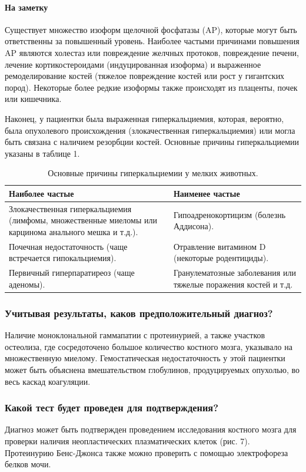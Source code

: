 \documentclass[a4paper,12pt]{book}
\begin{document}
\paragraph{На заметку}
Существует множество изоформ щелочной фосфатазы (AP), которые могут быть ответственны за повышенный уровень. Наиболее частыми причинами повышения AP являются холестаз или повреждение желчных протоков, повреждение печени, лечение кортикостероидами (индуцированная изоформа) и выраженное ремоделирование костей (тяжелое повреждение костей или рост у гигантских пород). Некоторые более редкие изоформы также происходят из плаценты, почек или кишечника.

Наконец, у пациентки была выраженная гиперкальциемия, которая, вероятно, была опухолевого происхождения (злокачественная гиперкальциемия) или могла быть связана с наличием резорбции костей. Основные причины гиперкальциемии указаны в таблице 1.

\begin{table}[htbp]
\centering
\caption{Основные причины гиперкальциемии у мелких животных.}
\begin{tabular}{p{7cm}p{7cm}}
\toprule
Наиболее частые & Наименее частые \\
\midrule
Злокачественная гиперкальциемия (лимфомы, множественные миеломы или карцинома анального мешка и т.д.). & Гипоадренокортицизм (болезнь Аддисона). \\
Почечная недостаточность (чаще встречается гипокальциемия). & Отравление витамином D (некоторые родентициды). \\
Первичный гиперпаратиреоз (чаще аденомы). & Гранулематозные заболевания или тяжелые поражения костей и т.д. \\
\bottomrule
\end{tabular}
\end{table}

\subsubsection*{Учитывая результаты, каков предположительный диагноз?}
Наличие моноклональной гаммапатии с протеинурией, а также участков остеолиза, где сосредоточено большое количество костного мозга, указывало на множественную миелому. Гемостатическая недостаточность у этой пациентки может быть объяснена вмешательством глобулинов, продуцируемых опухолью, во весь каскад коагуляции.

\subsubsection*{Какой тест будет проведен для подтверждения?}
Диагноз может быть подтвержден проведением исследования костного мозга для проверки наличия неопластических плазматических клеток (рис. 7). Протеинурию Бенс-Джонса также можно проверить с помощью электрофореза белков мочи.
\end{document}
